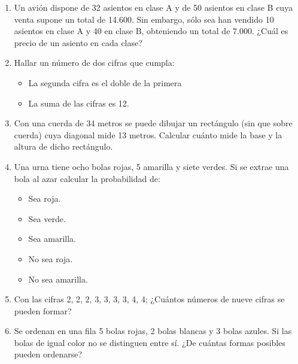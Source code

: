 \documentclass[12pt,letterpaper]{report}
\begin{document}
\begin{enumerate}
\begin{equation*}
x(3x+2)>(x+2)2
\end{equation*}
\item Un avión dispone de 32 asientos en clase A y de 50 asientos en clase B cuya venta supone un total de 14.600. Sin embargo, sólo sea han vendido 10 asientos en clase A y 40 en clase B, obteniendo un total de 7.000.
¿Cuál es precio de un asiento en cada clase?
\item Hallar un número de dos cifras que cumpla:
\begin{itemize}
\item La segunda cifra es el doble de la primera
\item La suma de las cifras es 12.
\end{itemize}
\item Con una cuerda de 34 metros se puede dibujar un rectángulo (sin que sobre cuerda) cuya diagonal mide 13 metros.
Calcular cuánto mide la base y la altura de dicho rectángulo.
\item Una urna tiene ocho bolas rojas, 5 amarilla y siete verdes. Si se extrae una
bola al azar calcular la probabilidad de:
\begin{itemize}
\item Sea roja.
\item  Sea verde.
\item  Sea amarilla.
\item  No sea roja.
\item  No sea amarilla.
\end{itemize}
\item Con las cifras 2, 2, 2, 3, 3, 3, 3, 4, 4;
¿Cuántos números de nueve cifras se pueden formar?
\item Se ordenan en una fila 5 bolas rojas, 2 bolas blancas y 3 bolas azules.
Si las bolas de igual color no se distinguen entre sí.
¿De cuántas formas posibles pueden ordenarse?
\end{enumerate}
\end{document}
